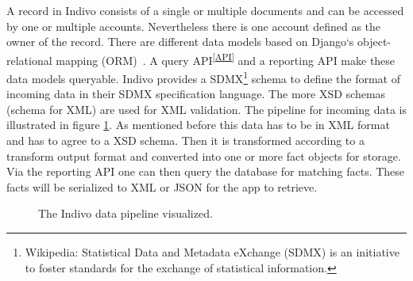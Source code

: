 A record in Indivo consists of a single or multiple documents and can be accessed by one or multiple accounts. Nevertheless there is one account defined as the owner of the record. There are different data models based on Django`s object-relational mapping (ORM)~\cite{django}. A query API\textsuperscript{\ref{API}} and a reporting API make these data models queryable. Indivo provides a SDMX\footnote{Wikipedia: Statistical Data and Metadata eXchange (SDMX) is an initiative to foster standards for the exchange of statistical information.} schema to define the format of incoming data in their SDMX specification language. The more XSD schemas (schema for XML) are used for XML validation. The pipeline for incoming data is illustrated in figure \ref{fig:indivoPipeline}. As mentioned before this data has to be in XML format and has to agree to a XSD schema. Then it is transformed according to a transform output format and converted into one or more fact objects for storage. Via the reporting API one can then query the database for matching facts. These facts will be serialized to XML or JSON for the app to retrieve.

\begin{figure}[ht]
%
\caption{The Indivo data pipeline visualized.~\cite{indivoDoc}}
\label{fig:indivoPipeline}
\end{figure} 

